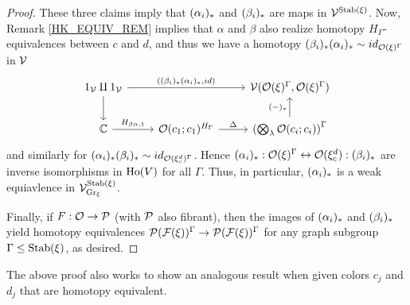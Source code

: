 \documentclass[a4paper,10pt
,draft
]{article}%
\renewcommand{\F}{\mathcal F}
\renewcommand{\1}{\ensuremath{\mathbb{id}}}
\begin{document}
\begin{proof}
      These three claims imply that $(\alpha_i)_{\**}$ and $(\beta_i)_{\**}$ are maps in $\V^{\Stab(\ksi)}$.
      Now, Remark \ref{HK_EQUIV_REM} implies that $\alpha$ and $\beta$ also realize homotopy $H_\Gamma$-equivalences between $c$ and $d$,
      and thus we have a homotopy $(\beta_i)_{\**}(\alpha_i)_{\**} \sim id_{\O(\ksi)^\Gamma}$ in $\V$
      \begin{equation}
            \begin{tikzcd}
                  1_\V \amalg 1_\V \arrow[rr, "{((\beta_i)_{\**}(\alpha_i)_{\**}, id)}"] \arrow[d]
                  &&
                  \V(\O(\ksi)^\Gamma, \O(\ksi)^\Gamma)
                  \\
                  \mathbb C \arrow[r, "H_{\beta\alpha,1}"]
                  &
                  \O(c_1;c_1)^{H_\Gamma} \arrow[r, "\Delta"]
                  &
                  \left(
                        \bigotimes_\lambda \O(c_i;c_i)
                  \right)^\Gamma
                  \arrow[u, "{(-)_{\**}}"]
            \end{tikzcd}
      \end{equation}
      and similarly for $(\alpha_i)_{\**}(\beta_i)_{\**} \sim id_{\O(\ksi_c^d)^\Gamma}$.
      Hence
      $(\alpha_i)_{\**}: \O(\ksi)^\Gamma \leftrightarrow \O(\ksi_c^d): (\beta_i)_{\**}$
      are inverse isomorphisms in $\Ho(V)$ for all $\Gamma$.
      Thus, in particular, $(\alpha_i)_{\**}$ is a weak equiavlence in $\V^{\Stab(\ksi)}_{\mathrm{Gr}_\ksi}$.     
      
      Finally, if $F: \O \to \P$ (with $\P$ also fibrant),
      then the images of $(\alpha_i)_{\**}$ and $(\beta_i)_{\**}$ yield
      homotopy equivalences $\P(\F(\ksi))^\Gamma \to \P(\F(\ksi))^\Gamma$ for any graph subgroup $\Gamma \leq \Stab(\ksi)$,
      as desired.
\end{proof}

\begin{remark}
      \label{CAV_4.14_REM}
      The above proof also works to show an analogous result when given colors $c_j$ and $d_j$ that are homotopy equivalent.
\end{remark}
\end{document}
